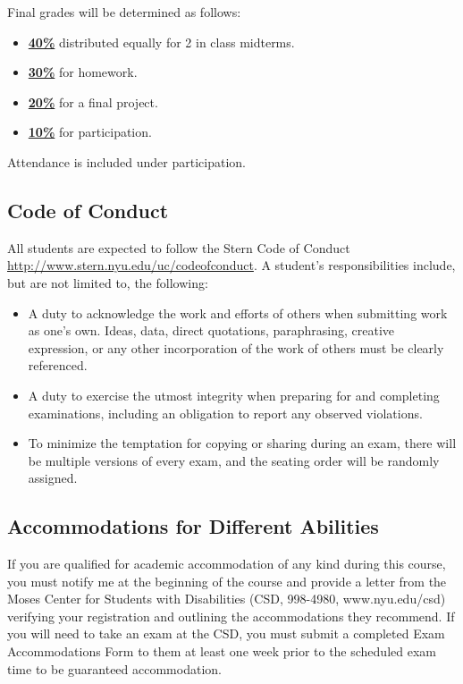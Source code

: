 \documentclass[11pt]{article}
\begin{document}
Final grades will be determined as follows:
\begin{itemize}
    \item \underline{\textbf{40\%}} distributed equally for 2 in class midterms. 
    \item \underline{\textbf{30\%}} for homework.
    \item \underline{\textbf{20\%}} for a final project.
    \item \underline{\textbf{10\%}} for participation.
\end{itemize}

Attendance is included under participation.

\subsection*{Code of Conduct}

All students are expected to follow the Stern Code of Conduct \url{http://www.stern.nyu.edu/uc/codeofconduct}. A student's responsibilities include, but are not limited to, the following:
\begin{itemize}
\item A duty to acknowledge the work and efforts of others when submitting work as one's own.
Ideas, data, direct quotations, paraphrasing, creative expression, or any other incorporation
of the work of others must be clearly referenced.
\item A duty to exercise the utmost integrity when preparing for and completing examinations, including an obligation to report any observed violations.
\item To minimize the temptation for copying or sharing during an exam, there will be multiple versions of every exam, and the seating order will be randomly assigned.
\end{itemize}

\subsection*{Accommodations for Different Abilities}
If you are qualified for academic accommodation of any kind during this course, you must notify me at the beginning of the course and provide a letter from the Moses Center for Students with Disabilities (CSD, 998-4980, www.nyu.edu/csd) verifying your registration and outlining the accommodations they recommend.  If you will need to take an exam at the CSD, you must submit a completed Exam Accommodations Form to them at least one week prior to the scheduled exam time to be guaranteed accommodation.
\end{document}
